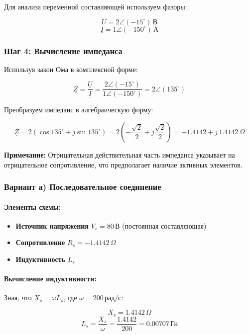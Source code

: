 \documentclass{article}
\begin{document}
Для анализа переменной составляющей используем фазоры:

\[
\underline{U} = 2\angle (-15^\circ) \, \text{В}
\]
\[
\underline{I} = 1\angle (-150^\circ) \, \text{А}
\]

\subsubsection*{Шаг 4: Вычисление импеданса}

Используя закон Ома в комплексной форме:

\[
\underline{Z} = \frac{\underline{U}}{\underline{I}} = \frac{2\angle (-15^\circ)}{1\angle (-150^\circ)} = 2\angle (135^\circ)
\]

Преобразуем импеданс в алгебраическую форму:

\[
\underline{Z} = 2\left( \cos 135^\circ + j \sin 135^\circ \right) = 2\left( -\frac{\sqrt{2}}{2} + j\frac{\sqrt{2}}{2} \right) = -1.4142 + j\,1.4142 \, \Omega
\]

\textbf{Примечание:} Отрицательная действительная часть импеданса указывает на отрицательное сопротивление, что предполагает наличие активных элементов.

\subsubsection*{Вариант а) Последовательное соединение}

\paragraph*{Элементы схемы:}

\begin{itemize}
    \item \textbf{Источник напряжения} \( V_s = 80 \, \text{В} \) (постоянная составляющая)
    \item \textbf{Сопротивление} \( R_s = -1.4142 \, \Omega \)
    \item \textbf{Индуктивность} \( L_s \)
\end{itemize}

\paragraph*{Вычисление индуктивности:}

Зная, что \( X_s = \omega L_s \), где \( \omega = 200 \, \text{рад/с} \):

\[
X_s = 1.4142 \, \Omega
\]
\[
L_s = \frac{X_s}{\omega} = \frac{1.4142}{200} = 0.00707 \, \text{Гн}
\]
\end{document}
